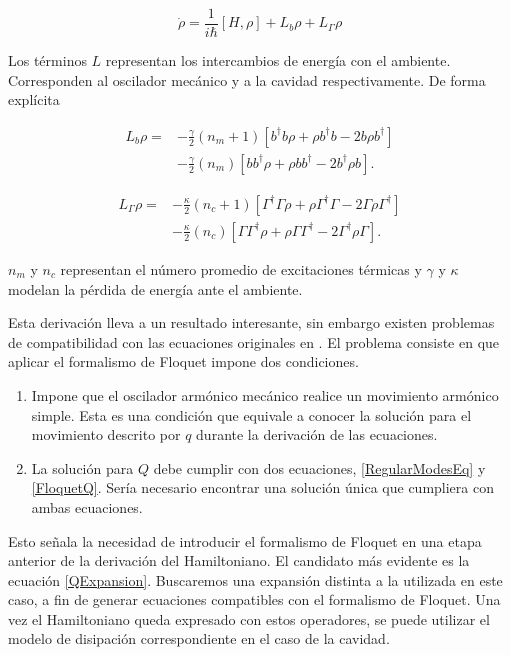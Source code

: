 \documentclass[10pt,a4paper]{report}
\begin{document}
\begin{equation} \label{LCMasterEquation}
\dot{\rho} = \frac{1}{i\hbar}[H,\rho] +L_b\rho + L_\Gamma \rho
\end{equation}

Los términos $L$ representan los intercambios de energía con el ambiente. Corresponden al oscilador mecánico y a la cavidad respectivamente. De forma explícita

\begin{align}
L_b \rho =& - \frac{\gamma}{2}(n_m + 1)[b^\dagger b\rho + \rho b^\dagger b -2b\rho b^\dagger]  \\
 &- \frac{\gamma}{2}(n_m)[ bb^\dagger\rho + \rho  bb^\dagger -2b^\dagger\rho b].\nonumber
\end{align} 

\begin{align}
L_\Gamma \rho =& - \frac{\kappa}{2}(n_c + 1)[\Gamma^\dagger \Gamma\rho + \rho \Gamma^\dagger \Gamma -2\Gamma\rho \Gamma^\dagger]  \\
 &- \frac{\kappa}{2}(n_c)[ \Gamma\Gamma^\dagger\rho + \rho  \Gamma\Gamma^\dagger -2\Gamma^\dagger\rho \Gamma].\nonumber
\end{align}

$n_m$ y $n_c$ representan el número promedio de excitaciones térmicas y $\gamma$ y $\kappa$ modelan la pérdida de energía ante el ambiente. 

Esta derivación lleva a un resultado interesante, sin embargo existen problemas de compatibilidad con las ecuaciones originales en \cite{LawOH}. El problema consiste en que aplicar el formalismo de Floquet impone dos condiciones. 

\begin{enumerate}
\item Impone que el oscilador armónico mecánico realice un movimiento armónico simple. Esta es una condición que equivale a conocer la solución para el movimiento descrito por $q$ durante la derivación de las ecuaciones.

\item La solución para $Q$ debe cumplir con dos ecuaciones, \eqref{RegularModesEq} y \eqref{FloquetQ}. Sería necesario encontrar una solución única que cumpliera con ambas ecuaciones. 
\end{enumerate}

Esto señala la necesidad de introducir el formalismo de Floquet en una etapa anterior de la derivación del Hamiltoniano. El candidato más evidente es la ecuación \eqref{QExpansion}. Buscaremos una expansión distinta a la utilizada en este caso, a fin de generar ecuaciones compatibles con el formalismo de Floquet. Una vez el Hamiltoniano queda expresado con estos operadores, se puede utilizar el modelo de disipación correspondiente en el caso de la cavidad.
\end{document}
